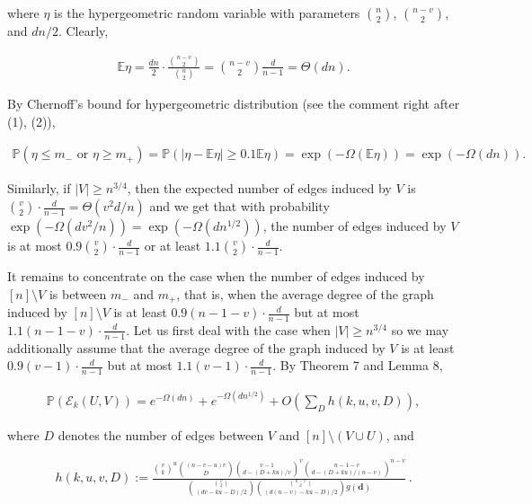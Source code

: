 \documentclass[10pt,a4paper]{article}
\begin{document}
where $\eta$ is the hypergeometric random variable with parameters $\binom{n}{2}$, $\binom{n-v}{2}$, and $dn/2$. Clearly,\par


\[\begin{gathered}
\mathbb{E}\eta=\frac{dn}{2}\cdot\frac{\binom{n-v}{2}}{\binom{n}{2}}={n-v\choose 2}\frac{d}{n-1}=\Theta(dn).
\end{gathered}\]


By Chernoff’s bound for hypergeometric distribution (see the comment right after (1), (2)),\par


\[\begin{gathered}
\mathbb{P}(\eta\leq m_{-}\text{ or }\eta\geq m_{+})=\mathbb{P}\left(|\eta-\mathbb{E}\eta|\geq 0.1\mathbb{E}\eta\right)=\exp\left(-\Omega\left(\mathbb{E}\eta\right)\right)=\exp(-\Omega(dn)).
\end{gathered}\]




Similarly, if $|V|\geq n^{3/4}$, then the expected number of edges induced by $V$ is $\binom{v}{2}\cdot\frac{d}{n-1}=\Theta(v^{2}d/n)$ and we get that with probability $\exp(-\Omega(dv^{2}/n))=\exp(-\Omega(dn^{1/2}))$, the number of edges induced by $V$ is at most $0.9\binom{v}{2}\cdot\frac{d}{n-1}$ or at least $1.1\binom{v}{2}\cdot\frac{d}{n-1}$.\par




It remains to concentrate on the case when the number of edges induced by $[n]\setminus V$ is between $m_{-}$ and $m_{+}$, that is, when the average degree of the graph induced by $[n]\setminus V$ is at least $0.9(n-1-v)\cdot\frac{d}{n-1}$ but at most $1.1(n-1-v)\cdot\frac{d}{n-1}$. Let us first deal with the case when $|V|\geq n^{3/4}$ so we may additionally assume that the average degree of the graph induced by $V$ is at least $0.9(v-1)\cdot\frac{d}{n-1}$ but at most $1.1(v-1)\cdot\frac{d}{n-1}$. By Theorem 7 and Lemma 8,\par


\[\begin{gathered}
\mathbb{P}(\mathcal{E}_{k}(U,V))=e^{-\Omega(dn)}+e^{-\Omega(dn^{1/2})}+O\left(\sum_{D}h(k,u,v,D)\right),
\end{gathered}\]


where $D$ denotes the number of edges between $V$ and $[n]\setminus(V\cup U)$, and\par


\[\begin{gathered}
h(k,u,v,D):=\frac{{v\choose k}^{u}{(n-v-u)v\choose D}\binom{v-1}{d-(D+ku)/v}^{v}{n-1-v\choose d-(D+ku)/(n-v)}^{n-v}}{\binom{{v\choose 2}}{(dv-ku-D)/2}{{n-v\choose 2}\choose(d(n-v)-ku-D)/2}g(\mathbf{d})}\,.
\end{gathered}\]
\end{document}
